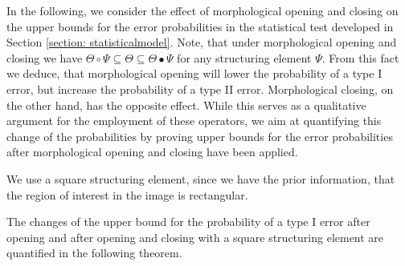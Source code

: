 \documentclass[a4paper,12pt]{article}
\theoremstyle{plain}
\theoremstyle{definition}
\numberwithin{equation}{section}
\begin{document}
In the following, we consider the effect of morphological opening and closing on the upper bounds for the error probabilities in the statistical test developed in Section \ref{section: statisticalmodel}. Note, that under morphological opening and closing we have $\Theta \circ \Psi \subseteq \Theta \subseteq \Theta \bullet \Psi$ for any structuring element $\Psi$. From this fact we deduce, that morphological opening will lower the probability of a type I error, but increase the probability of a type II error. Morphological closing, on the other hand, has the opposite effect. While this serves as a qualitative argument for the employment of these operators, we aim at quantifying this change of the probabilities by proving upper bounds for the error probabilities after morphological opening and closing have been applied.

We use a square structuring element, since we have the prior information, that the region of interest in the image is rectangular.

The changes of the upper bound for the probability of a type I error after opening and after opening and closing with a square structuring element are quantified in the following theorem.
\end{document}
